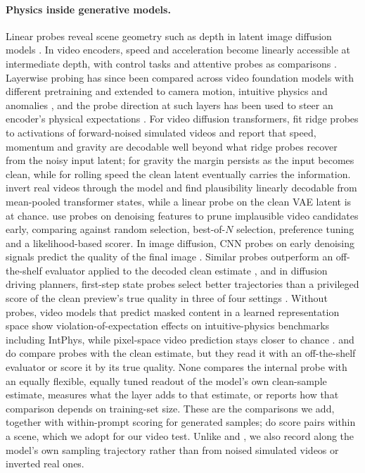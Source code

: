 \paragraph{Physics inside generative models.}
Linear probes reveal scene geometry such as depth in latent image diffusion models \citep{chen2023beyond}. In video encoders, speed and acceleration become linearly accessible at intermediate depth, with control tasks and attentive probes as comparisons \citep{joseph2026interpreting}. Layerwise probing has since been compared across video foundation models with different pretraining \citep{punzo2026video} and extended to camera motion, intuitive physics and anomalies \citep{musa2026whatwhere}, and the probe direction at such layers has been used to steer an encoder's physical expectations \citep{alam2026steering}. For video diffusion transformers, \citet{kneifl2026physics} fit ridge probes to activations of forward-noised simulated videos and report that speed, momentum and gravity are decodable well beyond what ridge probes recover from the noisy input latent; for gravity the margin persists as the input becomes clean, while for rolling speed the clean latent eventually carries the information. \citet{esmati2026invisible} invert real videos through the model and find plausibility linearly decodable from mean-pooled transformer states, while a linear probe on the clean VAE latent is at chance. \citet{tang2026seeking} use probes on denoising features to prune implausible video candidates early, comparing against random selection, best-of-$N$ selection, preference tuning and a likelihood-based scorer. In image diffusion, CNN probes on early denoising signals predict the quality of the final image \citep{cui2026diffusionprobe}. Similar probes outperform an off-the-shelf evaluator applied to the decoded clean estimate \citep{guo2026early}, and in diffusion driving planners, first-step state probes select better trajectories than a privileged score of the clean preview's true quality in three of four settings \citep{zhang2026readability}. Without probes, video models that predict masked content in a learned representation space show violation-of-expectation effects on intuitive-physics benchmarks including IntPhys, while pixel-space video prediction stays closer to chance \citep{garrido2025intuitive}. \citet{guo2026early} and \citet{zhang2026readability} do compare probes with the clean estimate, but they read it with an off-the-shelf evaluator or score it by its true quality. None compares the internal probe with an equally flexible, equally tuned readout of the model's own clean-sample estimate, measures what the layer adds to that estimate, or reports how that comparison depends on training-set size. These are the comparisons we add, together with within-prompt scoring for generated samples; \citet{esmati2026invisible} do score pairs within a scene, which we adopt for our video test. Unlike \citet{kneifl2026physics} and \citet{esmati2026invisible}, we also record along the model's own sampling trajectory rather than from noised simulated videos or inverted real ones.

